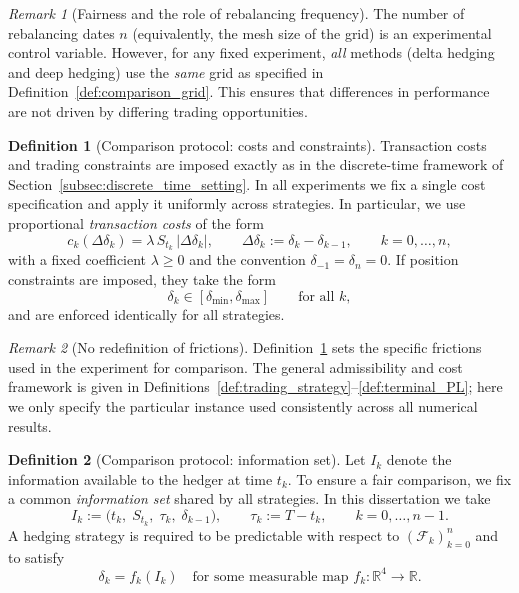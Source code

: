 \documentclass[12pt,a4paper]{article}
\theoremstyle{definition}
\newtheorem{definition}{Definition}[section]
\theoremstyle{plain}
\theoremstyle{remark}
\newtheorem{remark}{Remark}[section]
\theoremstyle{plain}
\begin{document}
\begin{remark}[Fairness and the role of rebalancing frequency]
\label{rem:grid_fairness}
The number of rebalancing dates $n$ (equivalently, the mesh size of the grid) is an experimental control variable.
However, for any fixed experiment, \emph{all} methods (delta hedging and deep hedging) use the \emph{same} grid as specified in Definition~\ref{def:comparison_grid}.
This ensures that differences in performance are not driven by differing trading opportunities.
\end{remark}

\begin{definition}[Comparison protocol: costs and constraints]
\label{def:comparison_costs_constraints}
Transaction costs and trading constraints are imposed exactly as in the discrete-time framework of Section~\ref{subsec:discrete_time_setting}.
In all experiments we fix a single cost specification and apply it uniformly across strategies.
In particular, we use proportional \emph{transaction costs} of the form
\[
c_k(\Delta \delta_k) = \lambda\, S_{t_k}\, |\Delta \delta_k|,
\qquad
\Delta \delta_k := \delta_k - \delta_{k-1},
\qquad
k=0,\dots,n,
\]
with a fixed coefficient $\lambda\ge 0$ and the convention $\delta_{-1}=\delta_n=0$.
If position constraints are imposed, they take the form
\[
\delta_k \in [\delta_{\min},\delta_{\max}]
\qquad\text{for all } k,
\]
and are enforced identically for all strategies.
\end{definition}

\begin{remark}[No redefinition of frictions]
\label{rem:no_redefine_frictions}
Definition~\ref{def:comparison_costs_constraints} sets the specific frictions used in the experiment for comparison.
The general admissibility and cost framework is given in Definitions~\ref{def:trading_strategy}--\ref{def:terminal_PL}; here we only specify the particular instance used consistently across all numerical results.
\end{remark}

\begin{definition}[Comparison protocol: information set]
\label{def:comparison_information}
Let $I_k$ denote the information available to the hedger at time $t_k$.
To ensure a fair comparison, we fix a common \emph{information set} shared by all strategies.
In this dissertation we take
\[
I_k := \bigl(t_k,\; S_{t_k},\; \tau_k,\; \delta_{k-1}\bigr),
\qquad
\tau_k := T-t_k,
\qquad
k=0,\dots,n-1.
\]
A hedging strategy is required to be predictable with respect to $(\mathcal{F}_k)_{k=0}^n$ and to satisfy
\[
\delta_k = f_k(I_k)
\quad\text{for some measurable map } f_k:\mathbb{R}^4\to\mathbb{R}.
\]
\end{definition}
\end{document}
